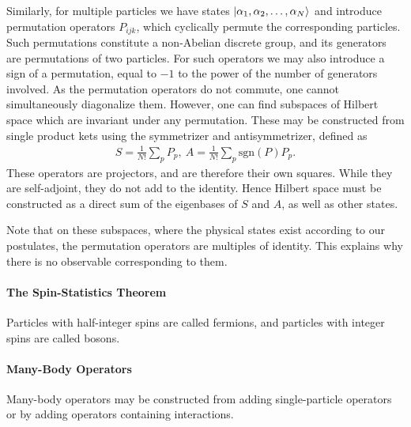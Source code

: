 Similarly, for multiple particles we have states $\ket{\alpha_{1}, \alpha_{2}, \dots, \alpha_{N}}$ and introduce permutation operators $P_{ijk}$, which cyclically permute the corresponding particles. Such permutations constitute a non-Abelian discrete group, and its generators are permutations of two particles. For such operators we may also introduce a sign of a permutation, equal to $-1$ to the power of the number of generators involved. As the permutation operators do not commute, one cannot simultaneously diagonalize them. However, one can find subspaces of Hilbert space which are invariant under any permutation. These may be constructed from single product kets using the symmetrizer and antisymmetrizer, defined as
\begin{align*}
	S = \frac{1}{N!}\sum\limits_{p}P_{p},\ A = \frac{1}{N!}\sum\limits_{p}\text{sgn}(P)P_{p}.
\end{align*}
These operators are projectors, and are therefore their own squares. While they are self-adjoint, they do not add to the identity. Hence Hilbert space must be constructed as a direct sum of the eigenbases of $S$ and $A$, as well as other states.

Note that on these subspaces, where the physical states exist according to our postulates, the permutation operators are multiples of identity. This explains why there is no observable corresponding to them.

\paragraph{The Spin-Statistics Theorem}
Particles with half-integer spins are called fermions, and particles with integer spins are called bosons.

\paragraph{Many-Body Operators}
Many-body operators may be constructed from adding single-particle operators or by adding operators containing interactions.